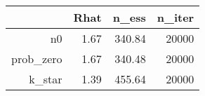 \begin{table}[ht]
\centering
\begin{tabular}{rrrr}
  \hline
 & Rhat & n\_ess & n\_iter \\ 
  \hline
n0 & 1.67 & 340.84 & 20000 \\ 
  prob\_zero & 1.67 & 340.48 & 20000 \\ 
  k\_star & 1.39 & 455.64 & 20000 \\ 
   \hline
\end{tabular}
\end{table}
